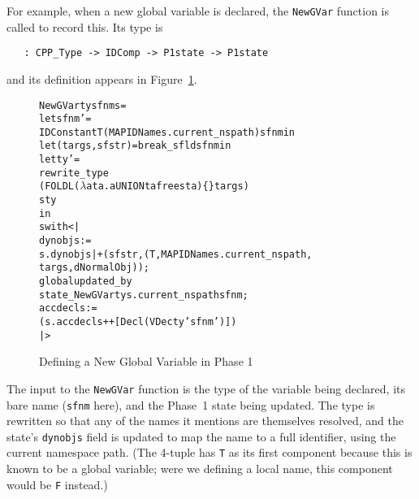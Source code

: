 \documentclass[11pt]{article}
\newcommand{\lbr}{\texttt{\{}}
\newcommand{\rbr}{\texttt{\}}}
\begin{document}
For example, when a new global variable is declared, the
\texttt{NewGVar} function is called to record this.  Its type is
\begin{verbatim}
   : CPP_Type -> IDComp -> P1state -> P1state
\end{verbatim}
and its definition appears in Figure~\ref{fig:newgvar-def}.
\begin{figure}[hbtp]
\begin{center}
\begin{minipage}{\textwidth}
\begin{alltt}
   NewGVar ty sfnm s =
     let sfnm' =
       IDConstant T (MAP IDName s.current_nspath) sfnm in
     let (targs,sfstr) = break_sfld sfnm in
     let ty' =
       rewrite_type
         (FOLDL (\(\lambda\)a ta. a UNION tafrees ta) \lbr\rbr targs)
         s ty
     in
       s with <|
         dynobjs :=
           s.dynobjs |+ (sfstr, (T,MAP IDName s.current_nspath,
                                 targs, dNormalObj)) ;
         global updated_by
           state_NewGVar ty s.current_nspath sfnm ;
         accdecls :=
           (s.accdecls ++ [Decl (VDec ty' sfnm')])
       |>
\end{alltt}
\end{minipage}
\end{center}
\caption{Defining a New Global Variable in Phase 1}
\label{fig:newgvar-def}
\end{figure}
The input to the \texttt{NewGVar} function is the type of the variable
being declared, its bare name (\texttt{sfnm} here), and the Phase~1
state being updated.  The type is rewritten so that any of the names
it mentions are themselves resolved, and the state's \texttt{dynobjs}
field is updated to map the name to a full identifier, using the
current namespace path.  (The 4-tuple has \texttt{T} as its first
component because this is known to be a global variable; were we
defining a local name, this component would be \texttt{F} instead.)
\end{document}
